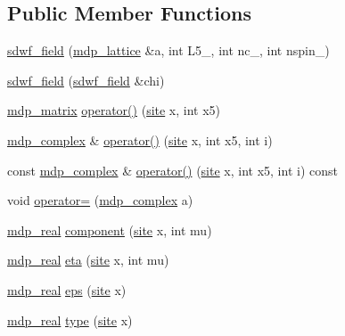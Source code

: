 \subsection*{Public Member Functions}
\begin{DoxyCompactItemize}
\item 
\hyperlink{classsdwf__field_a904cdf6c1f542aa5d4873b5c049a0de5}{sdwf\+\_\+field} (\hyperlink{classmdp__lattice}{mdp\+\_\+lattice} \&a, int L5\+\_\+, int nc\+\_\+, int nspin\+\_)
\item 
\hyperlink{classsdwf__field_af1438250ba08d632c4906ef99ad907ea}{sdwf\+\_\+field} (\hyperlink{classsdwf__field}{sdwf\+\_\+field} \&chi)
\item 
\hyperlink{classmdp__matrix}{mdp\+\_\+matrix} \hyperlink{classsdwf__field_a18764312ba3bb72577b2e29429854024}{operator()} (\hyperlink{mdp__compatibility__macros_8h_aa6f1179c424e48adef1cedf7c436eb75}{site} x, int x5)
\item 
\hyperlink{classmdp__complex}{mdp\+\_\+complex} \& \hyperlink{classsdwf__field_a1cd68e8911b77c60ecd6a1cd245ec047}{operator()} (\hyperlink{mdp__compatibility__macros_8h_aa6f1179c424e48adef1cedf7c436eb75}{site} x, int x5, int i)
\item 
const \hyperlink{classmdp__complex}{mdp\+\_\+complex} \& \hyperlink{classsdwf__field_a47117ef7a81d02150a5f38c8b0a4aaaa}{operator()} (\hyperlink{mdp__compatibility__macros_8h_aa6f1179c424e48adef1cedf7c436eb75}{site} x, int x5, int i) const
\item 
void \hyperlink{classsdwf__field_ac9bbccf6442b9f1a1a07b18fd2fe442c}{operator=} (\hyperlink{classmdp__complex}{mdp\+\_\+complex} a)
\item 
\hyperlink{mdp__global__vars_8h_a69d96b74c791e0bbdb888b3913a69450}{mdp\+\_\+real} \hyperlink{classsdwf__field_aa834c736322bef716cd0e31a391623d3}{component} (\hyperlink{mdp__compatibility__macros_8h_aa6f1179c424e48adef1cedf7c436eb75}{site} x, int mu)
\item 
\hyperlink{mdp__global__vars_8h_a69d96b74c791e0bbdb888b3913a69450}{mdp\+\_\+real} \hyperlink{classsdwf__field_ae50c1b9db65cd8056ed9286bde99e791}{eta} (\hyperlink{mdp__compatibility__macros_8h_aa6f1179c424e48adef1cedf7c436eb75}{site} x, int mu)
\item 
\hyperlink{mdp__global__vars_8h_a69d96b74c791e0bbdb888b3913a69450}{mdp\+\_\+real} \hyperlink{classsdwf__field_a3cc6aef9972ab5cceab9646578857db0}{eps} (\hyperlink{mdp__compatibility__macros_8h_aa6f1179c424e48adef1cedf7c436eb75}{site} x)
\item 
\hyperlink{mdp__global__vars_8h_a69d96b74c791e0bbdb888b3913a69450}{mdp\+\_\+real} \hyperlink{classsdwf__field_a7227345aef0414528513479dad854568}{type} (\hyperlink{mdp__compatibility__macros_8h_aa6f1179c424e48adef1cedf7c436eb75}{site} x)

\end{DoxyCompactItemize}
